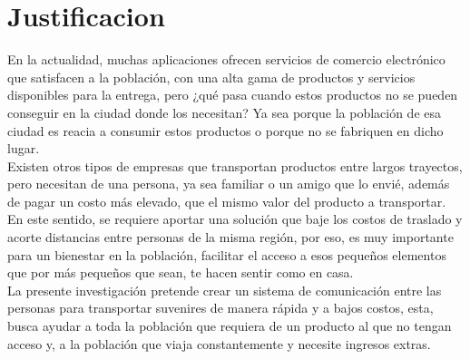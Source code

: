 \section{Justificacion}

{En la actualidad, muchas aplicaciones ofrecen servicios de comercio electrónico que satisfacen a la población, con una alta gama de productos y servicios disponibles para la entrega, pero ¿qué pasa cuando estos productos no se pueden conseguir en la ciudad donde los necesitan? Ya sea porque la población de esa ciudad es reacia a consumir estos productos o porque no se fabriquen en dicho lugar. \\
	
Existen otros tipos de empresas que transportan productos entre largos trayectos, pero necesitan de una persona, ya sea familiar o un amigo que lo envié, además de pagar un costo más elevado, que el mismo valor del producto a transportar.  \\

En este sentido, se requiere aportar una solución que baje los costos de traslado y acorte distancias entre personas de la misma región, por eso, es muy importante para un bienestar en la población, facilitar el acceso a esos pequeños elementos que por más pequeños que sean, te hacen sentir como en casa. \\

La presente investigación pretende crear un sistema de comunicación entre las personas para transportar suvenires de manera rápida y a bajos costos, esta, busca ayudar a toda la población que requiera de un producto al que no tengan acceso y, a la población que viaja constantemente y necesite ingresos extras. }